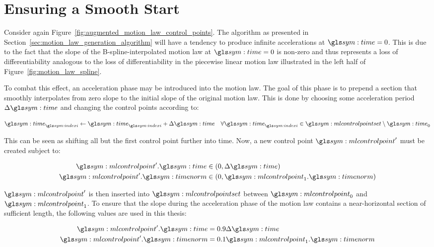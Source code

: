\section{Ensuring a Smooth Start}%
\label{sec:ensuring_a_smooth_start}

	Consider again Figure~\ref{fig:augmented_motion_law_control_points}. The
	algorithm as presented in Section~\ref{sec:motion_law_generation_algorithm}
	will have a tendency to produce infinite accelerations at $\timesym = 0$.
	This is due to the fact that the slope of the B-spline-interpolated motion
	law at $\timesym = 0$ is non-zero and thus represents a loss of
	differentiability analogous to the loss of differentiability in the
	piecewise linear motion law illustrated in the left half of
	Figure~\ref{fig:motion_law_spline}.

	To combat this effect, an acceleration phase may be introduced into the
	motion law. The goal of this phase is to prepend a section that smoothly
	interpolates from zero slope to the initial slope of the original motion
	law. This is done by choosing some acceleration period $\Delta\timesym$ and
	changing the control points according to:

	\begin{equation}
		\timesym_{\indexi} \gets \timesym_{\indexi} + \Delta\timesym
			\quad\forall\timesym_{\indexi} \in \mlcontrolpointset \setminus \timesym_0
	\end{equation}

	This can be seen as shifting all but the first control point further into
	time. Now, a new control point $\mlcontrolpoint'$ must be created subject
	to:

	\begin{align}
		\begin{split}
			\mlcontrolpoint'.\timesym &\in (0, \Delta\timesym)\\
			\mlcontrolpoint'.\timenorm &\in (0, \mlcontrolpoint_1.\timenorm)
		\end{split}
	\end{align}

	$\mlcontrolpoint'$ is then inserted into $\mlcontrolpointset$ between
	$\mlcontrolpoint_0 $ and $\mlcontrolpoint_1$. To ensure that the slope
	during the acceleration phase of the motion law contains a near-horizontal
	section of sufficient length, the following values are used in this thesis:

	\begin{align}
		\begin{split}
			\mlcontrolpoint'.\timesym &= 0.9\Delta\timesym\\
			\mlcontrolpoint'.\timenorm &= 0.1\mlcontrolpoint_1.\timenorm
		\end{split}
	\end{align}

